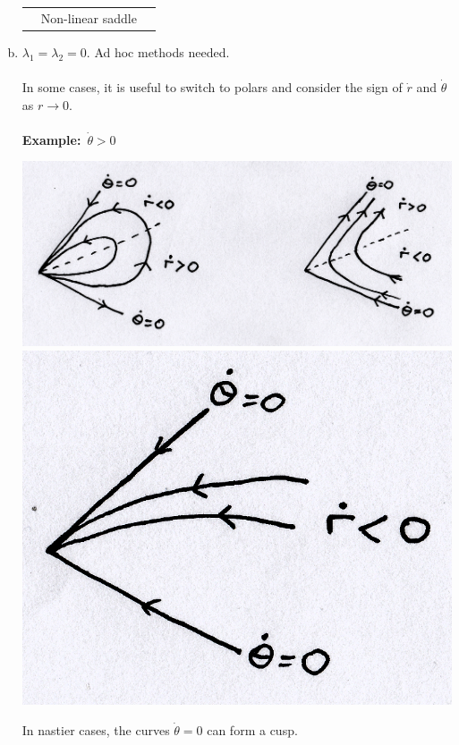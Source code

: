 \documentclass{article}
\newcommand{\example}{\textbf{Example:}}                    %
\begin{document}
\begin{enumerate}[(a)]
\begin{center}
\begin{tabular}{ m{3cm} m{3cm} m{3cm}  }
& Non-linear saddle
\end{tabular}
\end{center}
\item $\lambda_1 = \lambda_2 = 0$. Ad hoc methods needed.
\\
\\
In some cases, it is useful to switch to polars and consider the sign of
$\dot{r}$ and $\dot{\theta}$ as $r \to 0$.
\\
\\
\example\ $\dot{\theta} >0$ \\
\begin{center}
\includegraphics[scale = 0.15]{fig17.png} \\
\includegraphics[scale = 0.16]{fig18.png}
\end{center}
In nastier cases, the curves $\dot{\theta} = 0$ can form a cusp.
\begin{center}

\end{center}
\end{enumerate}
\end{document}
